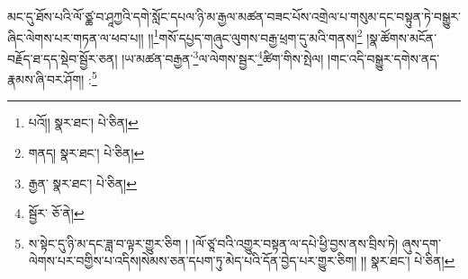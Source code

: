 མང་དུ་ཐོས་པའི་ལོ་ཙྪ་བ་ཤཱཀྱའི་དགེ་སློང་དཔལ་ཉི་མ་རྒྱལ་མཚན་བཟང་པོས་འགྲེལ་པ་གསུམ་དང་བསྟུན་ཏེ་བསྒྱུར་ཞིང་ལེགས་པར་གཏན་ལ་ཕབ་པ།། །།\footnote{པའོ།།  སྣར་ཐང་།  པེ་ཅིན། }གསོ་དཔྱད་གཞུང་ལུགས་བརྒྱ་ཕྲག་དུ་མའི་གནས།\footnote{གནད།  སྣར་ཐང་།  པེ་ཅིན། } །སྣ་ཚོགས་མངོན་བརྗོད་ཐ་དད་སྡེབ་སྦྱོར་ཅན། །ཡ་མཚན་བརྒྱན་\footnote{རྒྱན་  སྣར་ཐང་།  པེ་ཅིན། }ལ་ལེགས་སྦྱར་\footnote{སྦྱོར་  ཅོ་ནེ། }ཚིག་གིས་སྤེལ། །གང་འདི་བསྒྱུར་དགེས་ནད་རྣམས་ཞི་བར་ཤོག། :\footnote{ས་སྟེང་དུ་ཉི་མ་དང་ཟླ་བ་ལྟར་གྱུར་ཅིག ། །ལོ་ཙཱ་བའི་འགྱུར་བསྟན་ལ་དཔེ་ཕྱི་བྱས་ནས་བྲིས་ཏེ། ཞུས་དག་ལེགས་པར་བགྱིས་པ་འདིས།སེམས་ཅན་དཔག་ཏུ་མེད་པའི་དོན་བྱེད་པར་གྱུར་ཅིག། །།  སྣར་ཐང་།  པེ་ཅིན། }
